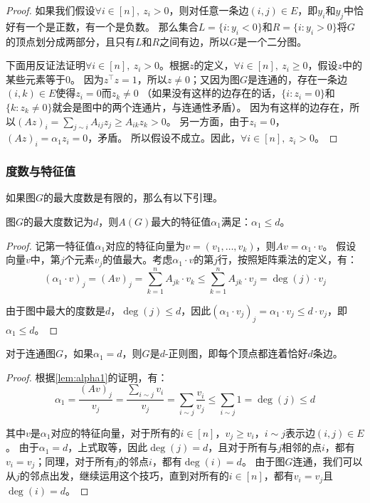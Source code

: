\documentclass[lang=cn,newtx,10pt,scheme=chinese,chinesefont=nofont,citestyle=gb7714-2015, bibstyle=gb7714-2015]{elegantbook}
\begin{document}
\begin{refsection}
\begin{proof}
    如果我们假设$\forall i\in[n],\ z_i>0$，则对任意一条边$(i,j)\in E$，即$y_i$和$y_j$中恰好有一个是正数，有一个是负数。
    那么集合$L=\{i:y_i<0\}$和$R=\{i:y_i>0\}$将$G$的顶点划分成两部分，且只有$L$和$R$之间有边，所以$G$是一个二分图。

    下面用反证法证明$\forall i\in[n],\ z_i>0$。根据$z$的定义，$\forall i\in[n],\ z_i\ge0$，假设$z$中的某些元素等于0。
    因为$z^\top z=1$，所以$z\neq0$；又因为图$G$是连通的，存在一条边$(i,k)\in E$使得$z_i=0$而$z_k\neq0$
    （如果没有这样的边存在的话，$\{i:z_i=0\}$和$\{k:z_k\neq0\}$就会是图中的两个连通片，与连通性矛盾）。
    因为有这样的边存在，所以$(Az)_i=\sum_{j\sim i}A_{ij}z_j\ge A_{ik}z_k>0$。
    另一方面，由于$z_i=0$，$(Az)_i=\alpha_1 z_i=0$，矛盾。
    所以假设不成立。因此，$\forall i\in[n],\ z_i>0$。
\end{proof}
\subsubsection{度数与特征值}
\example 如果图$G$的最大度数是有限的，那么有以下引理。

\begin{lemma}\label{lem:alpha1}
    图$G$的最大度数记为$d$，则$A(G)$最大的特征值$\alpha_1$满足：$\alpha_1\le d$。
\end{lemma}

\begin{proof}
    记第一特征值$\alpha_1$对应的特征向量为$v=(v_1,\dots,v_k)$，则$Av=\alpha_1\cdot v$。
    假设向量$v$中，第$j$个元素$v_j$的值最大。考虑$\alpha_1\cdot v$的第$j$行，按照矩阵乘法的定义，有：
    \[
    (\alpha_1\cdot v)_j=(Av)_j=\sum_{k=1}^n A_{jk}\cdot v_k\le \sum_{k=1}^n A_{jk}\cdot v_j=\deg(j)\cdot v_j
    \]

    由于图中最大的度数是$d$，$\deg(j)\le d$，因此$(\alpha_1\cdot v_j)_j=\alpha_1\cdot v_j\le d\cdot v_j$，即$\alpha_1\le d$。
\end{proof}

\begin{lemma}
    对于连通图$G$，如果$\alpha_1=d$，则$G$是$d$-正则图，即每个顶点都连着恰好$d$条边。
\end{lemma}

\begin{proof}
    根据\cref{lem:alpha1}的证明，有：
    \[
    \alpha_1=\frac{(Av)_j}{v_j}=\frac{\sum_{i\sim j}v_i}{v_j}=\sum_{i\sim j}\frac{v_i}{v_j}
    \le\sum_{i\sim j} 1=\deg(j)\le d
    \]

    其中$v$是$\alpha_1$对应的特征向量，对于所有的$i\in[n]$，$v_j\ge v_i$，$i\sim j$表示边$(i,j)\in E$。
    由于$\alpha_1=d$，上式取等，因此$\deg(j)=d$，且对于所有与$j$相邻的点$i$，都有$v_i=v_j$；同理，对于所有$j$的邻点$i$，都有$\deg(i)=d$。
    由于图$G$连通，我们可以从$j$的邻点出发，继续运用这个技巧，直到对所有的$i\in[n]$，都有$v_i=v_j$且$\deg(i)=d$。
\end{proof}


\end{refsection}
\end{document}
